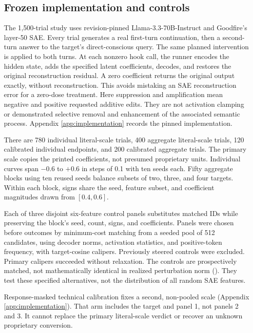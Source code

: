 \documentclass[11pt]{article}
\begin{document}
\subsection{Frozen implementation and controls}

The 1,500-trial study uses revision-pinned Llama-3.3-70B-Instruct and Goodfire's
layer-50 SAE. Every trial generates a real first-turn continuation, then a
second-turn answer to the target's direct-conscious query. The same planned
intervention is applied to both turns. At each nonzero hook call, the runner
encodes the hidden state, adds the specified latent coefficients, decodes,
and restores the original reconstruction residual. A zero coefficient returns
the original output exactly, without reconstruction. This avoids mistaking
an SAE reconstruction error for a zero-dose treatment.
Here suppression and amplification mean negative and positive requested
additive edits. They are not activation clamping or demonstrated selective
removal and enhancement of the associated semantic process. Appendix
\ref{app:implementation} records the pinned implementation.

There are 780 individual literal-scale trials, 400 aggregate literal-scale
trials, 120 calibrated individual endpoints, and 200 calibrated aggregate
trials. The primary scale copies the printed coefficients, not presumed
proprietary units. Individual curves span $-0.6$ to $+0.6$ in steps of 0.1
with ten seeds each. Fifty aggregate blocks using ten reused seeds balance subsets of two, three,
and four targets. Within each block, signs share the seed, feature subset,
and coefficient magnitudes drawn from $[0.4,0.6]$.

Each of three disjoint six-feature control panels substitutes matched IDs
while preserving the block's seed, count, signs, and coefficients. Panels
were chosen before outcomes by minimum-cost matching from a seeded pool of
512 candidates, using decoder norms, activation statistics, and positive-token
frequency, with target-cosine calipers. Previously steered controls were
excluded. Primary calipers succeeded without relaxation. The controls are
prospectively matched, not mathematically identical in realized perturbation
norm (). They test these specified alternatives, not the
distribution of all random SAE features.

Response-masked technical calibration fixes a second, non-pooled scale
(Appendix \ref{app:implementation}). That arm includes the target and panel 1,
not panels 2 and 3. It cannot replace the primary literal-scale verdict or
recover an unknown proprietary conversion.
\end{document}
